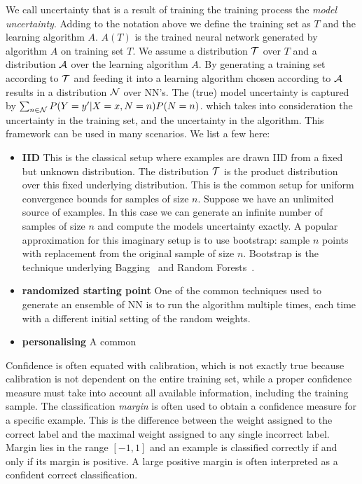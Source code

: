 \documentclass{article}
\begin{document}
We call uncertainty that is a result of training the training process the {\em model uncertainty}. Adding to the notation above we define the training set as $T$ and the learning algorithm $A$. $A(T)$ is the trained neural network generated by algorithm $A$ on training set $T$. We assume a distribution ${\cal T}$ over $T$ and a distribution ${\cal A}$ over the learning algorithm $A$. By generating a training set according to ${\cal T}$  and feeding it into a learning algorithm chosen according to ${\cal A}$ results in a distribution ${\cal N}$ over NN's.
The (true) model uncertainty is captured by $\sum_{n \in {\cal N}} P(Y=y' | X=x,N=n)P(N=n)$. 
which takes into consideration the uncertainty in the training set, and the uncertainty in the algorithm.
\fi
This framework can be used in many scenarios. We list a few here:
\begin{itemize}
    \item {\bf IID} This is the classical setup where examples are drawn IID from a fixed but unknown distribution. The distribution ${\cal T}$ is the product distribution over this fixed underlying distribution. This is the common setup for uniform convergence bounds for samples of size $n$. 
    Suppose we have an unlimited source of examples. In this case we can generate an infinite number of samples of size $n$ and compute the models uncertainty exactly.  A popular approximation for this imaginary setup is to use bootstrap: sample $n$ points with replacement from the original sample of size $n$. Bootstrap is the technique underlying Bagging~\cite{} and Random Forests~\cite{}.
    \item {\bf randomized starting point} One of the common techniques used to generate an ensemble of NN is to run the algorithm multiple times, each time with a different initial setting of the random weights.
    \item {\bf personalising} A common
\end{itemize}


Confidence is often equated with calibration, which is not exactly true because calibration is not dependent on the entire training set, while a proper confidence measure must take into account all available information, including the training sample. 
\iffalse
The classification \emph{margin} is often used to obtain a confidence measure for a specific example. This is the difference between the weight assigned to the correct label and the maximal weight assigned to any single incorrect label. Margin lies in the range $[-1,1]$ and an example is classified correctly if
and only if its margin is positive. A large positive margin is often interpreted as a confident correct classification.
\end{document}
